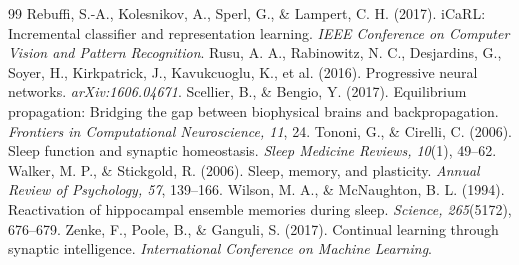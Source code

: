 \documentclass[11pt]{article}
\begin{document}
\begin{thebibliography}{99}
 Rebuffi, S.-A., Kolesnikov, A., Sperl, G., \& Lampert, C. H. (2017). iCaRL: Incremental classifier and representation learning. \textit{IEEE Conference on Computer Vision and Pattern Recognition}.
 Rusu, A. A., Rabinowitz, N. C., Desjardins, G., Soyer, H., Kirkpatrick, J., Kavukcuoglu, K., et al. (2016). Progressive neural networks. \textit{arXiv:1606.04671}.
 Scellier, B., \& Bengio, Y. (2017). Equilibrium propagation: Bridging the gap between biophysical brains and backpropagation. \textit{Frontiers in Computational Neuroscience, 11}, 24.
 Tononi, G., \& Cirelli, C. (2006). Sleep function and synaptic homeostasis. \textit{Sleep Medicine Reviews, 10}(1), 49--62.
 Walker, M. P., \& Stickgold, R. (2006). Sleep, memory, and plasticity. \textit{Annual Review of Psychology, 57}, 139--166.
 Wilson, M. A., \& McNaughton, B. L. (1994). Reactivation of hippocampal ensemble memories during sleep. \textit{Science, 265}(5172), 676--679.
 Zenke, F., Poole, B., \& Ganguli, S. (2017). Continual learning through synaptic intelligence. \textit{International Conference on Machine Learning}.
\end{thebibliography}
\end{document}
